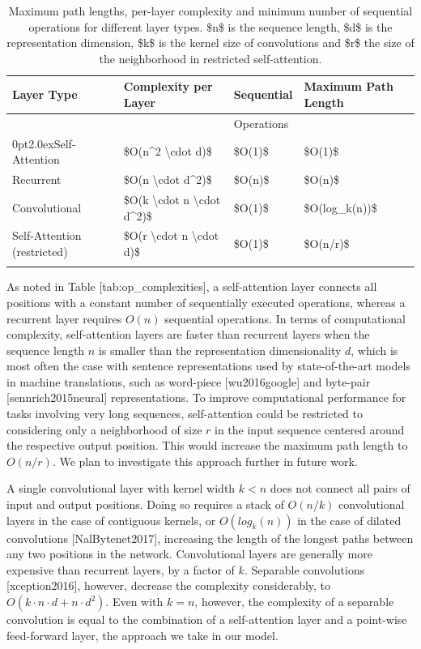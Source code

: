 \documentclass[11pt,a4paper]{article}
\begin{document}
\begin{table}[h]
\caption{Maximum path lengths, per-layer complexity and minimum number of sequential operations for different layer types. \$n\$ is the sequence length, \$d\$ is the representation dimension, \$k\$ is the kernel size of convolutions and \$r\$ the size of the neighborhood in restricted self-attention.}
\begin{tabular}{|l|l|l|l|}
\hline
Layer Type & Complexity per Layer & Sequential & Maximum Path Length \\ \hline
 &  & Operations &  \\ \hline
0pt2.0exSelf-Attention & \$O(n\textasciicircum{}2 \textbackslash{}cdot d)\$ & \$O(1)\$ & \$O(1)\$ \\ \hline
Recurrent & \$O(n \textbackslash{}cdot d\textasciicircum{}2)\$ & \$O(n)\$ & \$O(n)\$ \\ \hline
Convolutional & \$O(k \textbackslash{}cdot n \textbackslash{}cdot d\textasciicircum{}2)\$ & \$O(1)\$ & \$O(log\_k(n))\$ \\ \hline
Self-Attention (restricted) & \$O(r \textbackslash{}cdot n \textbackslash{}cdot d)\$ & \$O(1)\$ & \$O(n/r)\$ \\ \hline
 &  &  &  \\ \hline
\end{tabular}
\end{table}

As noted in Table [tab:op\_complexities], a self-attention layer connects all positions with a constant number of sequentially executed operations, whereas a recurrent layer requires $O(n)$ sequential operations. In terms of computational complexity, self-attention layers are faster than recurrent layers when the sequence length $n$ is smaller than the representation dimensionality $d$, which is most often the case with sentence representations used by state-of-the-art models in machine translations, such as word-piece [wu2016google] and byte-pair [sennrich2015neural] representations. To improve computational performance for tasks involving very long sequences, self-attention could be restricted to considering only a neighborhood of size $r$ in the input sequence centered around the respective output position. This would increase the maximum path length to $O(n/r)$. We plan to investigate this approach further in future work.

A single convolutional layer with kernel width $k < n$ does not connect all pairs of input and output positions. Doing so requires a stack of $O(n/k)$ convolutional layers in the case of contiguous kernels, or $O(log_k(n))$ in the case of dilated convolutions [NalBytenet2017], increasing the length of the longest paths between any two positions in the network. Convolutional layers are generally more expensive than recurrent layers, by a factor of $k$. Separable convolutions [xception2016], however, decrease the complexity considerably, to $O(k \cdot n \cdot d + n \cdot d^2)$. Even with $k=n$, however, the complexity of a separable convolution is equal to the combination of a self-attention layer and a point-wise feed-forward layer, the approach we take in our model.
\end{document}
